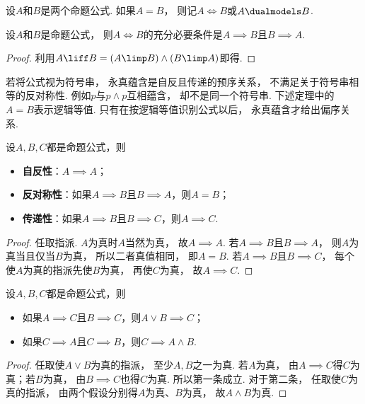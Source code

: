 \begin{definition}
设\(A\)和\(B\)是两个命题公式.
如果\(A = B\)，
则记\(A \iff B\)或\(A \dualmodels B\).
\end{definition}

\begin{theorem}
设\(A\)和\(B\)是命题公式，
则\(A \iff B\)的充分必要条件是\(A \implies B\)且\(B \implies A\).
\begin{proof}
利用\(A \liff B = (A \limp B) \land (B \limp A)\)即得.
\end{proof}
\end{theorem}

若将公式视为符号串，
永真蕴含是自反且传递的预序关系，
不满足关于符号串相等的反对称性.
例如\(p\)与\(p\land p\)互相蕴含，
却不是同一个符号串.
下述定理中的\(A=B\)表示逻辑等值.
只有在按逻辑等值识别公式以后，
永真蕴含才给出偏序关系.
\begin{theorem}
设\(A,B,C\)都是命题公式，则\begin{itemize}
	\item {\rm\bf 自反性}：\(A \implies A\)；
	\item {\rm\bf 反对称性}：如果\(A \implies B\)且\(B \implies A\)，则\(A = B\)；
	\item {\rm\bf 传递性}：如果\(A \implies B\)且\(B \implies C\)，则\(A \implies C\).
\end{itemize}
    \begin{proof}
        任取指派.
        \(A\)为真时\(A\)当然为真，
        故\(A\implies A\).
        若\(A\implies B\)且\(B\implies A\)，
        则\(A\)为真当且仅当\(B\)为真，
        所以二者真值相同，
        即\(A=B\).
        若\(A\implies B\)且\(B\implies C\)，
        每个使\(A\)为真的指派先使\(B\)为真，
        再使\(C\)为真，
        故\(A\implies C\).
    \end{proof}
\end{theorem}

\begin{theorem}
设\(A,B,C\)都是命题公式，则\begin{itemize}
	\item 如果\(A \implies C\)且\(B \implies C\)，则\(A \lor B \implies C\)；
	\item 如果\(C \implies A\)且\(C \implies B\)，则\(C \implies A \land B\).
\end{itemize}
    \begin{proof}
        任取使\(A\lor B\)为真的指派，
        至少\(A,B\)之一为真.
        若\(A\)为真，
        由\(A\implies C\)得\(C\)为真；若\(B\)为真，
        由\(B\implies C\)也得\(C\)为真.
        所以第一条成立.
        对于第二条，
        任取使\(C\)为真的指派，
        由两个假设分别得\(A\)为真、\(B\)为真，
        故\(A\land B\)为真.
    \end{proof}
\end{theorem}

